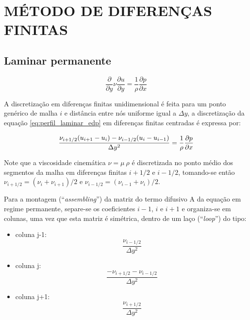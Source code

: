 \typeout{ ====================================================================}
\typeout{ ====================================================================}

\section{MÉTODO DE DIFERENÇAS FINITAS}

\subsection{Laminar permanente}

\begin{equation}
	\frac{\partial}{\partial y} \nu \frac{\partial u}{\partial y}
	=
	\frac{1}{\rho} \frac{\partial p}{\partial x}
\end{equation}

A discretização em diferenças finitas unidimensional é feita para um
ponto genérico de malha $i$ e distância entre nós uniforme igual a
$\Delta y$, a discretização da equação \ref{eq:perfil_laminar_edp} em
diferenças finitas centradas é expressa por:

\begin{eqnarray}
	\frac{\nu_{i+1/2}(u_{i+1}-u_{i})
	-
	\nu_{i-1/2}(u_{i}-u_{i-1})}{\Delta y^2} 
	=
	\frac{1}{\rho}\frac{\partial p}{\partial x} 
\label{eq:perfil_laminar_discr}
\end{eqnarray}

Note que a viscosidade cinemática $\nu = \mu \ \rho$ é discretizada no
ponto médio dos segmentos da malha em diferenças finitas $i+1/2$ e
$i-1/2$, tomando-se então $\nu_{i+1/2} = (\nu_{i}+\nu_{i+1})/2$ e
$\nu_{i-1/2} = (\nu_{i-1}+\nu_{i})/2$.

Para a montagem (``\emph{assembling}'') da matriz do termo difusivo A da
equação em regime permanente, separe-se os coeficientes $i-1$, $i$ e
$i+1$ e organiza-se em colunas, uma vez que esta matriz é simétrica,
dentro de um laço (``\emph{loop}'') do tipo:

\begin{itemize}
	\item{coluna j-1:}
		\begin{equation}
			\frac{\nu_{i-1/2}}{\Delta y^2}
		\end{equation}
	\item{coluna j:}
		\begin{equation}
			\frac{-\nu_{i+1/2}-\nu_{i-1/2}}{\Delta y^2}
		\end{equation}
	\item{coluna j+1:}
		\begin{equation}
			\frac{\nu_{i+1/2}}{\Delta y^2}
		\end{equation}
\end{itemize}


